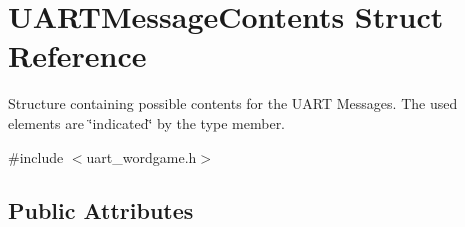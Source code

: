 \hypertarget{struct_u_a_r_t_message_contents}{}\section{U\+A\+R\+T\+Message\+Contents Struct Reference}
\label{struct_u_a_r_t_message_contents}


Structure containing possible contents for the U\+A\+RT Messages. The used elements are \char`\"{}indicated\char`\"{} by the type member.  




{\ttfamily \#include $<$uart\+\_\+wordgame.\+h$>$}

\subsection*{Public Attributes}
